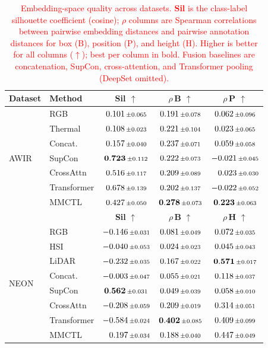 \documentclass[lettersize,journal]{IEEEtran}
\newcommand{\new}[1]{\textcolor{red}{#1}}
\begin{document}
\begin{table}[t]
\centering
\caption{\new{
Embedding-space quality across datasets. \textbf{Sil} is the class-label silhouette coefficient (cosine); \textbf{$\rho$} columns are Spearman correlations between pairwise embedding distances and pairwise annotation distances for box (B), position (P), and height (H). Higher is better for all columns ($\uparrow$); best per column in bold. Fusion baselines are concatenation, SupCon, cross-attention, and Transformer pooling (DeepSet omitted).
}}
\label{tab:latent_alignment}
{\color{red}
\begin{tabular}{l l c c c}
\toprule
\textbf{Dataset} & \textbf{Method}
& \textbf{Sil} $\uparrow$
& \textbf{$\rho$\,B} $\uparrow$
& \textbf{$\rho$\,P} $\uparrow$ \\
\midrule
\multirow{7}{*}{AWIR}
& RGB         & $0.101\,\scriptstyle\pm\,\!0.065$ & $0.191\,\scriptstyle\pm\,\!0.078$ & $0.062\,\scriptstyle\pm\,\!0.096$ \\
& Thermal     & $0.108\,\scriptstyle\pm\,\!0.023$ & $0.221\,\scriptstyle\pm\,\!0.104$ & $0.023\,\scriptstyle\pm\,\!0.065$ \\
\cmidrule(lr){2-5}
& Concat.     & $0.157\,\scriptstyle\pm\,\!0.040$ & $0.237\,\scriptstyle\pm\,\!0.071$ & $0.059\,\scriptstyle\pm\,\!0.058$ \\
& SupCon      & $\mathbf{0.723}\,\scriptstyle\pm\,\!0.112$ & $0.222\,\scriptstyle\pm\,\!0.073$ & $-0.021\,\scriptstyle\pm\,\!0.045$ \\
& CrossAttn   & $0.516\,\scriptstyle\pm\,\!0.117$ & $0.209\,\scriptstyle\pm\,\!0.089$ & $\phantom{-}0.023\,\scriptstyle\pm\,\!0.030$ \\
& Transformer & $0.678\,\scriptstyle\pm\,\!0.139$ & $0.202\,\scriptstyle\pm\,\!0.137$ & $-0.022\,\scriptstyle\pm\,\!0.052$ \\
\cmidrule(lr){2-5}
& MMCTL       & $0.427\,\scriptstyle\pm\,\!0.050$ & $\mathbf{0.278}\,\scriptstyle\pm\,\!0.073$ & $\mathbf{0.223}\,\scriptstyle\pm\,\!0.063$ \\
\midrule
\multicolumn{2}{l}{}
& \textbf{Sil} $\uparrow$
& \textbf{$\rho$\,B} $\uparrow$
& \textbf{$\rho$\,H} $\uparrow$ \\
\midrule
\multirow{8}{*}{NEON}
& RGB         & $-0.146\,\scriptstyle\pm\,\!0.031$ & $0.081\,\scriptstyle\pm\,\!0.049$ & $0.072\,\scriptstyle\pm\,\!0.035$ \\
& HSI         & $-0.040\,\scriptstyle\pm\,\!0.053$ & $0.024\,\scriptstyle\pm\,\!0.023$ & $0.045\,\scriptstyle\pm\,\!0.043$ \\
& LiDAR       & $-0.232\,\scriptstyle\pm\,\!0.035$ & $0.167\,\scriptstyle\pm\,\!0.022$ & $\mathbf{0.571}\,\scriptstyle\pm\,\!0.017$ \\
\cmidrule(lr){2-5}
& Concat.     & $-0.003\,\scriptstyle\pm\,\!0.047$ & $0.055\,\scriptstyle\pm\,\!0.021$ & $0.118\,\scriptstyle\pm\,\!0.037$ \\
& SupCon      & $\mathbf{0.562}\,\scriptstyle\pm\,\!0.031$ & $0.049\,\scriptstyle\pm\,\!0.039$ & $0.058\,\scriptstyle\pm\,\!0.010$ \\
& CrossAttn   & $-0.208\,\scriptstyle\pm\,\!0.059$ & $0.209\,\scriptstyle\pm\,\!0.019$ & $0.314\,\scriptstyle\pm\,\!0.051$ \\
& Transformer & $-0.584\,\scriptstyle\pm\,\!0.024$ & $\mathbf{0.402}\,\scriptstyle\pm\,\!0.085$ & $0.409\,\scriptstyle\pm\,\!0.099$ \\
\cmidrule(lr){2-5}
& MMCTL       & $\phantom{-}0.197\,\scriptstyle\pm\,\!0.034$ & $0.188\,\scriptstyle\pm\,\!0.040$ & $0.447\,\scriptstyle\pm\,\!0.049$ \\
\bottomrule
\end{tabular}
}
\end{table}
\end{document}
